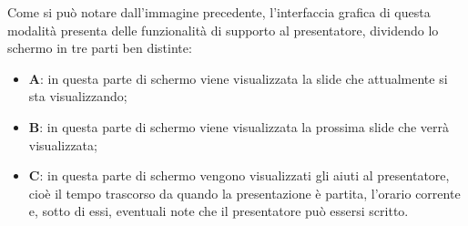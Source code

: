 \noindent Come si può notare dall'immagine precedente, l'interfaccia grafica di questa modalità presenta delle funzionalità di supporto al presentatore, dividendo lo schermo in tre parti ben distinte:
\begin{itemize}
	\item \textbf{A}: in questa parte di schermo viene visualizzata la slide che attualmente si sta visualizzando;
	\item \textbf{B}: in questa parte di schermo viene visualizzata la prossima slide che verrà visualizzata;
	\item \textbf{C}: in questa parte di schermo vengono visualizzati gli aiuti al presentatore, cioè il tempo trascorso da quando la presentazione è partita, l'orario corrente e, sotto di essi, eventuali note che il presentatore può essersi scritto. 
\end{itemize}


